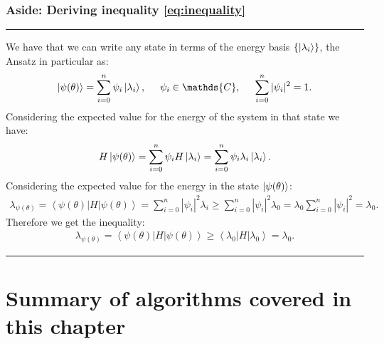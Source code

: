 \subsubsection{Aside: Deriving inequality \autoref{eq:inequality}}
\hrule
\vspace{\baselineskip}
We have that we can write any state in terms of the energy basis $\{\left\vert{\lambda_i}\right\rangle\}$, the Ansatz in particular as:
\begin{align*}
    \ket{\psi(\theta)}=\sum^n_{i=0} \psi_i \ket{\lambda_i}, \hspace{0.5cm} \psi_i \in \mathds{C}, \hspace{0.5cm}\sum^n_{i=0} |\psi_i|^2=1.
\end{align*}
Considering the expected value for the energy of the system in that state we have:
\begin{align*}
    H\left\vert{\psi(\theta)}\right\rangle=\sum^n_{i=0} \psi_i H\left\vert{\lambda_i}\right\rangle=\sum^n_{i=0} \psi_i \lambda_i\left\vert{\lambda_i}\right\rangle.
\end{align*}
Considering the expected value for the energy in the state $\left\vert{\psi(\theta)}\right\rangle$:
\begin{align*}
    \lambda_{\psi(\theta)}=\left < \psi(\theta)|H| \psi(\theta)\right>=\sum^n_{i=0} |\psi_i|^2 \lambda_i\geq \sum^n_{i=0} |\psi_i|^2 \lambda_0= \lambda_0 \sum^n_{i=0} |\psi_i|^2 =\lambda_0.
\end{align*}
Therefore we get the inequality:
\begin{align*}
   \lambda_{\psi(\theta)}=\left <\psi(\theta)|H| \psi(\theta)\right> \geq \left< \lambda_0|H| \lambda_0\right>= \lambda_0.
\end{align*}
\hrule
\vspace{\baselineskip}

\section{Summary of algorithms covered in this chapter}

